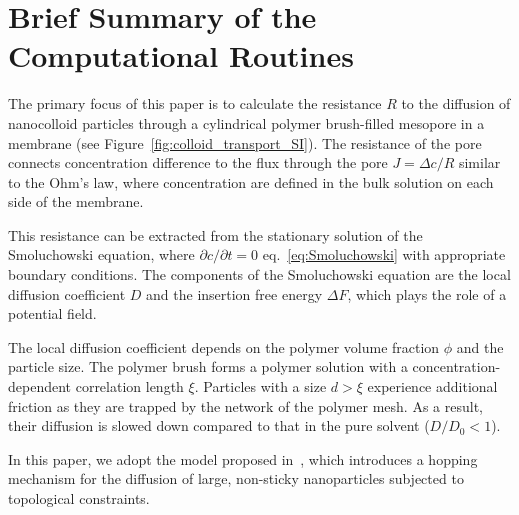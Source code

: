 \documentclass[10pt, a4paper]{article}
\begin{document}
\section{Brief Summary of the Computational Routines}
\begin{multicols}{2}

The primary focus of this paper is to calculate the resistance $R$ to the diffusion of nanocolloid particles through a cylindrical polymer brush-filled mesopore in a membrane (see Figure~\ref{fig:colloid_transport_SI}).
The resistance of the pore connects concentration difference to the flux through the pore $J = \Delta c / R$ similar to the Ohm's law, where concentration are defined in the bulk solution on each side of the membrane.

This resistance can be extracted from the stationary solution of the Smoluchowski equation, where $\partial c/\partial t = 0$ eq.~\ref{eq:Smoluchowski} with appropriate boundary conditions.
The components of the Smoluchowski equation are the local diffusion coefficient $D$ and the insertion free energy $\Delta F$, which plays the role of a potential field.

The local diffusion coefficient depends on the polymer volume fraction $\phi$ and the particle size.
The polymer brush forms a polymer solution with a concentration-dependent correlation length $\xi$.
Particles with a size $d > \xi$ experience additional friction as they are trapped by the network of the polymer mesh.
As a result, their diffusion is slowed down compared to that in the pure solvent ($D/D_0 < 1$).

In this paper, we adopt the model proposed in~\cite{Cai2011}, which introduces a hopping mechanism for the diffusion of large, non-sticky nanoparticles subjected to topological constraints.


\end{multicols}
\end{document}
